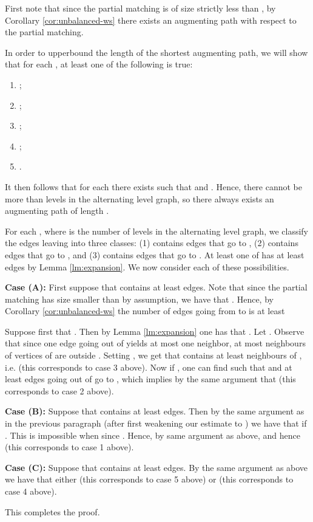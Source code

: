 \documentclass[11pt]{article}
\newenvironment{proofof}[1]{\noindent{\bf Proof of #1:}}{\par}
\begin{document}
\begin{proofof}{Lemma \ref{lm:main}}
First note that since the partial matching is of size strictly less than , by Corollary \ref{cor:unbalanced-ws} there exists an augmenting path with
 respect to the partial matching.

In order to upperbound the length of the shortest augmenting path, we will show that for each , at least one of the following is true:  

\begin{enumerate}
\item ;
\item ;
\item ;
\item ; 
\item .
\end{enumerate}

It then follows that for each   there exists  such that  and . Hence, there cannot be more than  levels in the alternating level graph, so there always exists an augmenting path of length .

For each , where  is the number of levels in the alternating level graph, we classify the edges leaving  into three classes:
(1)  contains edges that go to , (2)  contains edges that go to , and (3)  contains edges that go to .
At least one of  has at least  edges by Lemma \ref{lm:expansion}. We now consider each of these possibilities.

\textbf{Case (A):}
First suppose that  contains at least
  edges. Note that since the partial matching has size smaller than  by assumption, we have that . Hence, by Corollary \ref{cor:unbalanced-ws} the number of edges going from  to  is at least 


Suppose first that . Then by Lemma \ref{lm:expansion} one has that . Let . Observe that since one edge going out of  yields at most one neighbor, at most  neighbours of vertices of  are outside .  Setting , we get that  contains at least  neighbours of , i.e.  (this corresponds to case 3 above). Now if , one can find  such that  and at least  edges going out of  go to , which implies by the same argument that  (this corresponds to case 2 above).

\textbf{Case (B):} Suppose that  contains at least  edges. Then by the same argument as in the previous paragraph (after first weakening our estimate to ) we have that  if . This is impossible when  since . Hence,  by same argument as above, and hence  (this corresponds to case 1 above). 

\textbf{Case (C):} Suppose that  contains at least  edges.  By the same argument as above we have that either  (this corresponds to case 5 above) or  (this corresponds to case 4 above).

This completes the proof.
\end{proofof}
\end{document}
